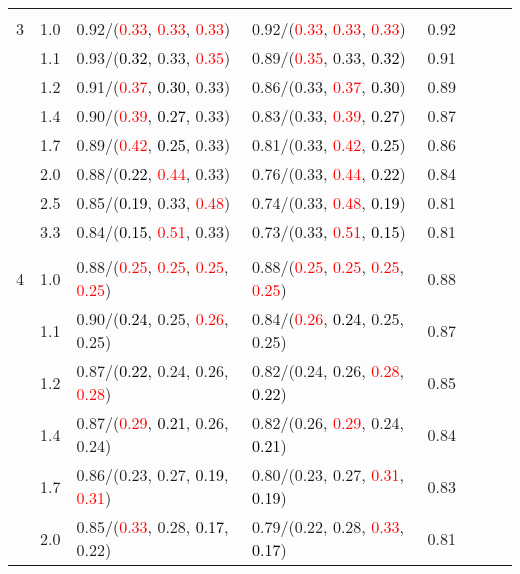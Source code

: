 \documentclass[10pt,a4paper]{report}
\begin{document}
\begin{table}[!htbp]
\begin{center}
{\begin{tabular}{ccllcccc}
			&&&&\\
			3			&1.0&0.92/(\textcolor{red}{0.33}, \textcolor{red}{0.33}, \textcolor{red}{0.33})&0.92/(\textcolor{red}{0.33}, \textcolor{red}{0.33}, \textcolor{red}{0.33})&0.92\\
			&1.1&0.93/(\textcolor{black}{0.32}, 0.33, \textcolor{red}{0.35})&0.89/(\textcolor{red}{0.35}, 0.33, \textcolor{black}{0.32})&0.91\\
			&1.2&0.91/(\textcolor{red}{0.37}, \textcolor{black}{0.30}, 0.33)&0.86/(0.33, \textcolor{red}{0.37}, \textcolor{black}{0.30})&0.89\\
			&1.4&0.90/(\textcolor{red}{0.39}, \textcolor{black}{0.27}, 0.33)&0.83/(0.33, \textcolor{red}{0.39}, \textcolor{black}{0.27})&0.87\\
			&1.7&0.89/(\textcolor{red}{0.42}, \textcolor{black}{0.25}, 0.33)&0.81/(0.33, \textcolor{red}{0.42}, \textcolor{black}{0.25})&0.86\\
			&2.0&0.88/(\textcolor{black}{0.22}, \textcolor{red}{0.44}, 0.33)&0.76/(0.33, \textcolor{red}{0.44}, \textcolor{black}{0.22})&0.84\\
			&2.5&0.85/(\textcolor{black}{0.19}, 0.33, \textcolor{red}{0.48})&0.74/(0.33, \textcolor{red}{0.48}, \textcolor{black}{0.19})&0.81\\
			&3.3&0.84/(\textcolor{black}{0.15}, \textcolor{red}{0.51}, 0.33)&0.73/(0.33, \textcolor{red}{0.51}, \textcolor{black}{0.15})&0.81\\
			&&&&\\
			4			&1.0&0.88/(\textcolor{red}{0.25}, \textcolor{red}{0.25}, \textcolor{red}{0.25}, \textcolor{red}{0.25})&0.88/(\textcolor{red}{0.25}, \textcolor{red}{0.25}, \textcolor{red}{0.25}, \textcolor{red}{0.25})&0.88\\
			&1.1&0.90/(\textcolor{black}{0.24}, 0.25, \textcolor{red}{0.26}, 0.25)&0.84/(\textcolor{red}{0.26}, \textcolor{black}{0.24}, 0.25, 0.25)&0.87\\
			&1.2&0.87/(\textcolor{black}{0.22}, 0.24, 0.26, \textcolor{red}{0.28})&0.82/(0.24, 0.26, \textcolor{red}{0.28}, \textcolor{black}{0.22})&0.85\\
			&1.4&0.87/(\textcolor{red}{0.29}, \textcolor{black}{0.21}, 0.26, 0.24)&0.82/(0.26, \textcolor{red}{0.29}, 0.24, \textcolor{black}{0.21})&0.84\\
			&1.7&0.86/(0.23, 0.27, \textcolor{black}{0.19}, \textcolor{red}{0.31})&0.80/(0.23, 0.27, \textcolor{red}{0.31}, \textcolor{black}{0.19})&0.83\\
			&2.0&0.85/(\textcolor{red}{0.33}, 0.28, \textcolor{black}{0.17}, 0.22)&0.79/(0.22, 0.28, \textcolor{red}{0.33}, \textcolor{black}{0.17})&0.81\\

\end{tabular}}
\end{center}
\end{table}
\end{document}
